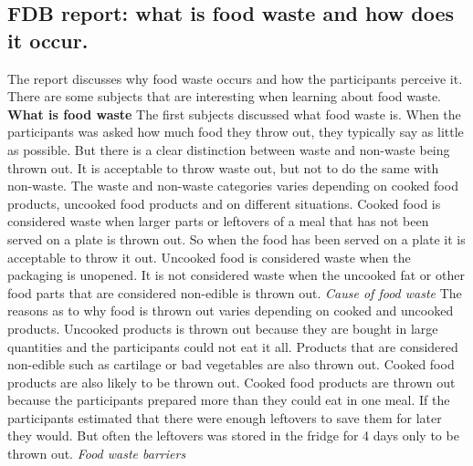 \subsection{FDB report: what is food waste and how does it occur.}
The report discusses why food waste occurs and how the participants perceive it. There are some subjects that are interesting when learning about food waste. 
\textbf{What is food waste} 
The first subjects discussed what food waste is. When the participants was asked how much food they throw out, they typically say as little as possible. But there is a clear distinction between waste and non-waste being thrown out. It is acceptable to throw waste out, but not to do the same with non-waste. The waste and non-waste categories varies depending on cooked food products, uncooked food products and on different situations. Cooked food is considered waste when larger parts or leftovers of a meal that has not been served on a plate is thrown out. So when the food has been served on a plate it is acceptable to throw it out. Uncooked food is considered waste when the packaging is unopened. It is not considered waste when the uncooked fat or other food parts that are considered non-edible is thrown out.
\textit{Cause of food waste} 
The reasons as to why food is thrown out varies depending on cooked and uncooked products. Uncooked products is thrown out because they are bought in large quantities and the participants could not eat it all. Products that are considered non-edible such as cartilage or bad vegetables are also thrown out. Cooked food products are also likely to be thrown out. Cooked food products are thrown out because the participants prepared more than they could eat in one meal. If the participants estimated that there were enough leftovers to save them for later they would. But often the leftovers was stored in the fridge for 4 days only to be thrown out.
\textit{Food waste barriers}
